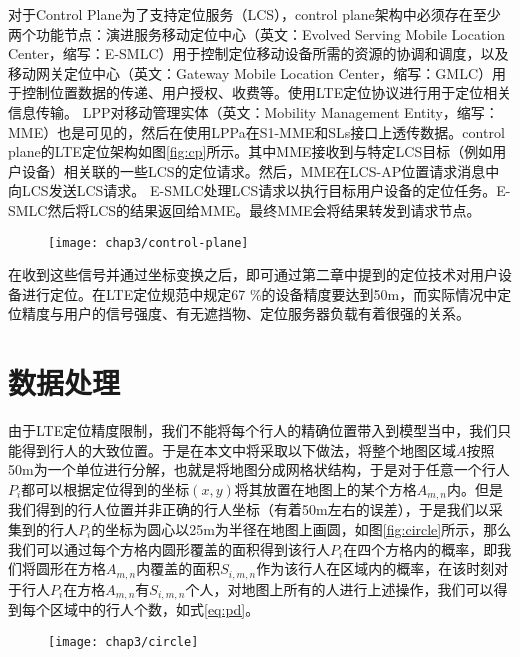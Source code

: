 对于Control Plane为了支持定位服务（LCS），control plane架构中必须存在至少两个功能节点：演进服务移动定位中心（英文：Evolved Serving Mobile Location Center，缩写：E-SMLC）用于控制定位移动设备所需的资源的协调和调度，以及移动网关定位中心（英文：Gateway Mobile Location Center，缩写：GMLC）用于控制位置数据的传递、用户授权、收费等。使用LTE定位协议进行用于定位相关信息传输。 LPP对移动管理实体（英文：Mobility Management Entity，缩写：MME）也是可见的，然后在使用LPPa在S1-MME和SLs接口上透传数据。control plane的LTE定位架构如图\ref{fig:cp}所示。其中MME接收到与特定LCS目标（例如用户设备）相关联的一些LCS的定位请求。然后，MME在LCS-AP位置请求消息中向LCS发送LCS请求。 E-SMLC处理LCS请求以执行目标用户设备的定位任务。E-SMLC然后将LCS的结果返回给MME。最终MME会将结果转发到请求节点。
\begin{figure}[!htp]
    \centering
    \texttt{[image: chap3/control-plane]}
\end{figure}

在收到这些信号并通过坐标变换之后，即可通过第二章中提到的定位技术对用户设备进行定位。在LTE定位规范中规定67 \%的设备精度要达到50m，而实际情况中定位精度与用户的信号强度、有无遮挡物、定位服务器负载有着很强的关系。

\section{数据处理}

由于LTE定位精度限制，我们不能将每个行人的精确位置带入到模型当中，我们只能得到行人的大致位置。于是在本文中将采取以下做法，将整个地图区域$A$按照50m为一个单位进行分解，也就是将地图分成网格状结构，于是对于任意一个行人$P_{i}$都可以根据定位得到的坐标$(x, y)$将其放置在地图上的某个方格$A_{m,n}$内。但是我们得到的行人位置并非正确的行人坐标（有着50m左右的误差），于是我们以采集到的行人$P_{i}$的坐标为圆心以25m为半径在地图上画圆，如图\ref{fig:circle}所示，那么我们可以通过每个方格内圆形覆盖的面积得到该行人$P_{i}$在四个方格内的概率，即我们将圆形在方格$A_{m,n}$内覆盖的面积$S_{i,m,n}$作为该行人在区域内的概率，在该时刻对于行人$P_{i}$在方格$A_{m,n}$有$S_{i,m,n}$个人，对地图上所有的人进行上述操作，我们可以得到每个区域中的行人个数，如式\ref{eq:pd}。

\begin{figure}[!htp]
    \centering
    \texttt{[image: chap3/circle]}
\end{figure}

